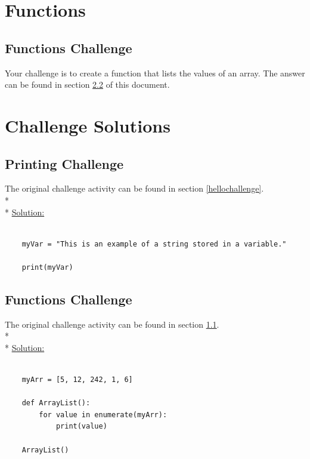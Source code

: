 \documentclass[12pt, letterpaper]{article}
\begin{document}
    \section{Functions} \label{functions}

    \subsection{Functions Challenge} \label{functionschallenge}

    Your challenge is to create a function that lists the values of an array. The answer can be found in section \ref{functionsol} of this document.

    
    \section{Challenge Solutions} \label{solutions}

    \subsection{Printing Challenge} \label{hellosol}
    The original challenge activity can be found in section \ref{hellochallenge}. \\*\\*
    \underline{Solution:}

    \begin{verbatim}
    
    myVar = "This is an example of a string stored in a variable."

    print(myVar)

    \end{verbatim}

    \subsection{Functions Challenge} \label{functionsol}

    The original challenge activity can be found in section \ref{functionschallenge}. \\* \\*
    \underline{Solution:}

    \begin{verbatim}

    myArr = [5, 12, 242, 1, 6]

    def ArrayList():
        for value in enumerate(myArr):
            print(value)
    
    ArrayList()
    
    \end{verbatim}
\end{document}
